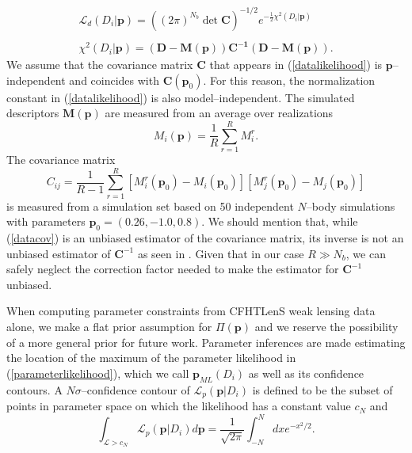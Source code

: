 \documentclass[reprint,aps,prd,superscriptaddress,showkeys,showpacs]{revtex4-1}
\begin{document}
\begin{equation}
\label{datalikelihood}
\begin{matrix}
\mathcal{L}_d(D_i\vert \mathbf{p}) = ((2\pi)^{N_b}\det{\mathbf{C}})^{-1/2} e^{-\frac{1}{2}\chi^2(D_i\vert \mathbf{p})} \\ \\
\chi^2(D_i\vert \mathbf{p}) = \mathbf{(D - M(p))C^{-1}(D-M(p))}.
\end{matrix}
\end{equation} 
%
We assume that the covariance matrix $\mathbf{C}$ that appears in (\ref{datalikelihood}) is $\mathbf{p}$--independent and coincides with $\mathbf{C}(\mathbf{p}_0)$. For this reason, the normalization constant in (\ref{datalikelihood}) is also model--independent. The simulated descriptors $\mathbf{M(p)}$ are measured from an average over realizations
\begin{equation}
M_i(\mathbf{p}) = \frac{1}{R}\sum_{r=1}^R M_i^r .
\end{equation}
%
The covariance matrix 
\begin{equation}
\label{datacov}
C_{ij} = \frac{1}{R-1} \sum_{r=1}^R [M_i^r(\mathbf{p}_0)-M_i(\mathbf{p}_0)][M_j^r(\mathbf{p}_0)-M_j(\mathbf{p}_0)]
\end{equation}
%
is measured from a simulation set based on 50 independent $N$--body simulations with parameters $\mathbf{p}_0=(0.26,-1.0,0.8)$. We should mention that, while (\ref{datacov}) is an unbiased estimator of the covariance matrix, its inverse is not an unbiased estimator of $\mathbf{C}^{-1}$ as seen in \citep{RayTracingHartlap}. Given that in our case $R\gg N_b$, we can safely neglect the correction factor needed to make the estimator for $\mathbf{C}^{-1}$ unbiased.

When computing parameter constraints from CFHTLenS weak lensing data alone, we make a flat prior assumption for $\Pi(\mathbf{p})$ and we reserve the possibility of a more general prior for future work. Parameter inferences are made estimating the location of the maximum of the parameter likelihood in (\ref{parameterlikelihood}), which we call $\mathbf{p}_{ML}(D_i)$ as well as its confidence contours. A $N\sigma$--confidence contour of $\mathcal{L}_p(\mathbf{p}\vert D_i)$ is defined to be the subset of points in parameter space on which the likelihood has a constant value $c_N$ and 
\begin{equation}
\label{ennesigma}
\int_{\mathcal{L}>c_N} \mathcal{L}_p(\mathbf{p}\vert D_i) d\mathbf{p} = \frac{1}{\sqrt{2\pi}}\int_{-N}^N dx e^{-x^2/2}.
\end{equation}
%
\end{document}
